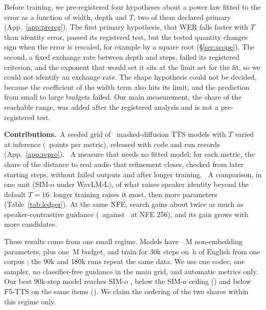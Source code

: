 Before training, we pre-registered four hypotheses about a power law fitted to the error as
a function of width, depth and $T$, two of them declared primary (App.~\ref{app:prereg}).
The first primary hypothesis, that WER falls faster with $T$ than identity error, passed its
registered test, but the tested quantity changes sign when the error is rescaled, for
example by a square root (\S\ref{sec:scope}). The second, a fixed exchange rate between
depth and steps, failed its registered criterion, and the exponent that would set it sits at
the limit set for the fit, so we could not identify an exchange rate. The shape hypothesis
could not be decided, because the coefficient of the width term also hits its limit, and the
prediction from small to large budgets failed. Our main measurement, the share of the reachable range, was added after the
registered analysis and is not a pre-registered test.

\noindent\textbf{Contributions.}\hspace{0.4em}~A seeded grid of \Nruns\
masked-diffusion TTS models with $T$ varied at inference (\Nsurface\ points per metric),
released with code and run records (App.~\ref{app:repro}).
~A measure that needs no fitted model: for each metric, the share of the distance to
real audio that refinement closes, checked from later starting steps, without failed outputs
and after longer training.
~A comparison, in one unit (SIM-o under WavLM-L), of what raises speaker identity
beyond the default $T{=}16$: longer training raises it most, then more parameters
(Table~\ref{tab:ledger}). At the same NFE, search gains about twice as much as
speaker-contrastive guidance (\NcrXEWMidd\ against \NcrGuideGainSim\ at NFE 256), and its
gain grows with more candidates.

These results come from one small regime. Models have \NminN--\NmaxN\,M non-embedding
parameters, plus one \NmaxNfour\,M budget, and train for 30k steps on \NtrainHours\,h of
English from one corpus \citep{emilia}; the 90k and 180k runs repeat the same data. We use
one codec, one sampler, no classifier-free guidance in the main grid, and automatic metrics
only. Our best 90k-step model reaches SIM-o \NcrsNinetykBestSIM, below the SIM-o
ceiling (\NsimCeiling) and below F5-TTS \citep{f5tts} on the same items (\NcrsFfSIM). We claim the
ordering of the two shares within this regime only.
